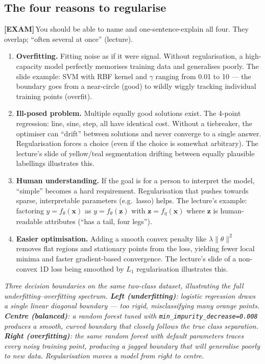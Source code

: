 \documentclass[11pt, a4paper]{article}
\newcommand{\examflag}{\textcolor{tipBd}{\textbf{[EXAM]}}\,}
\begin{document}
\subsection{The four reasons to regularise}

\examflag{}You should be able to name and one-sentence-explain all four. They overlap; ``often several at once'' (lecture).

\begin{enumerate}
  \item \textbf{Overfitting.} Fitting noise as if it were signal. Without regularisation, a high-capacity model perfectly memorises training data and generalises poorly. The slide example: SVM with RBF kernel and $\gamma$ ranging from 0.01 to 10 — the boundary goes from a near-circle (good) to wildly wiggly tracking individual training points (overfit).
  \item \textbf{Ill-posed problem.} Multiple equally good solutions exist. The 4-point regression: line, sine, step, all have identical cost. Without a tiebreaker, the optimiser can ``drift'' between solutions and never converge to a single answer. Regularisation forces a choice (even if the choice is somewhat arbitrary). The lecture's slide of yellow/teal segmentation drifting between equally plausible labellings illustrates this.
  \item \textbf{Human understanding.} If the goal is for a person to interpret the model, ``simple'' becomes a hard requirement. Regularisation that pushes towards sparse, interpretable parameters (e.g.\ lasso) helps. The lecture's example: factoring $y = f_\theta(\mathbf{x})$ as $y = f_\theta(\mathbf{z})$ with $\mathbf{z} = f_\eta(\mathbf{x})$ where $\mathbf{z}$ is human-readable attributes (``has a tail, four legs'').
  \item \textbf{Easier optimisation.} Adding a smooth convex penalty like $\lambda\|\theta\|^2$ removes flat regions and stationary points from the loss, yielding fewer local minima and faster gradient-based convergence. The lecture's slide of a non-convex 1D loss being smoothed by $L_1$ regularisation illustrates this.
\end{enumerate}

\begin{center}

\footnotesize\textit{Three decision boundaries on the same two-class dataset, illustrating the full underfitting--overfitting spectrum. \textbf{Left (underfitting)}: logistic regression draws a single linear diagonal boundary --- too rigid, misclassifying many orange points. \textbf{Centre (balanced)}: a random forest tuned with \texttt{min\_impurity\_decrease=0.008} produces a smooth, curved boundary that closely follows the true class separation. \textbf{Right (overfitting)}: the same random forest with default parameters traces every noisy training point, producing a jagged boundary that will generalise poorly to new data. Regularisation moves a model from right to centre.}
\end{center}
\end{document}
